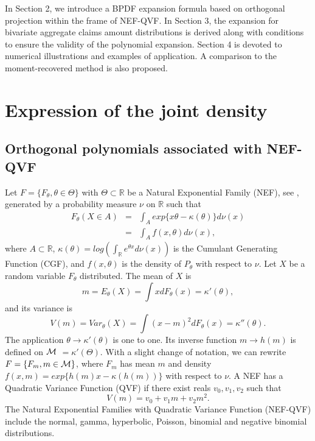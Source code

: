 In Section 2, we introduce a BPDF expansion formula based on orthogonal projection within the frame of NEF-QVF. In Section 3, the expansion for bivariate aggregate claims amount distributions is derived along with conditions to ensure the validity of the polynomial expansion. Section 4 is devoted to numerical illustrations and examples of application. A comparison to the moment-recovered method is also proposed. 
\section{Expression of the joint density}
\subsection{Orthogonal polynomials associated with NEF-QVF}
Let $F=\{F_{\theta},\theta\in\Theta\}$ with $\Theta\subset \mathbb{R}$ be a Natural Exponential Family (NEF), see \citet{Ba78}, generated by a probability measure $\nu$ on $\mathbb{R}$ such that
\begin{eqnarray*}
F_{\theta}(X\in A)&=&\int_{A}exp\{x\theta-\kappa(\theta)\}d\nu(x)\\
&=&\int_{A}f(x,\theta)d\nu(x),
\end{eqnarray*}
where $A\subset\mathbb{R}$, $\kappa(\theta)=log\left(\int_{\mathbb{R}}e^{\theta x}d\nu(x)\right)$ is the Cumulant Generating Function (CGF), and $f(x,\theta)$ is the density of $P_{\theta}$ with respect to $\nu$.
Let $X$ be a random variable  $F_{\theta}$ distributed. The mean of $X$ is
\[
m=E_{\theta}(X)=\int xdF_{\theta}(x)=\kappa'(\theta),
\]
and its variance is
\begin{equation*}
V(m)=Var_{\theta}(X)=\int (x-m)^{2}dF_{\theta}(x)=\kappa''(\theta).
\label{Variance}
\end{equation*}
The application $\theta\rightarrow\kappa'(\theta)$ is one to one. Its inverse function $m\rightarrow h(m)$ is defined on $\cal{M}$ $=\kappa'(\Theta)$. With a slight change of notation, we can rewrite $F=\{F_{m},m \in\cal{M}\}$, where $F_{m}$ has mean $m$ and density $f(x,m)=exp\{h(m)x-\kappa(h(m))\}$ with respect to $\nu$. A NEF has a Quadratic Variance Function (QVF) if there exist reals $v_0, v_1, v_2$ such that 
\begin{equation}\label{QVF}
V(m)=v_{0}+v_{1}m+v_{2}m^{2}.
\end{equation}
The Natural Exponential Families with Quadratic Variance Function (NEF-QVF) include the normal, gamma, hyperbolic, Poisson, binomial and negative binomial distributions.\\
